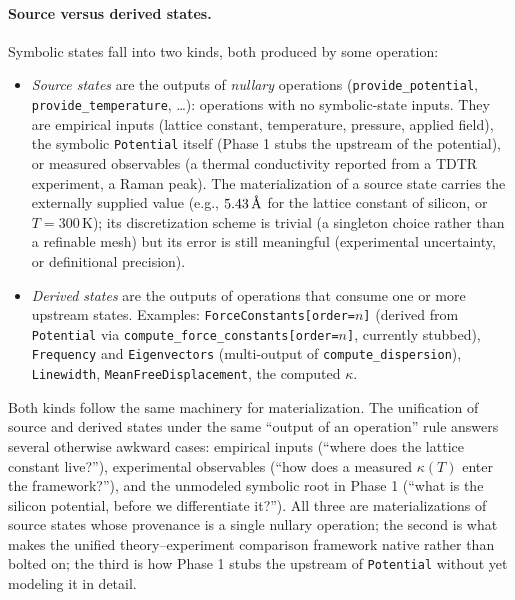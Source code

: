 \documentclass[11pt,a4paper]{article}
\begin{document}
\paragraph{Source versus derived states.} Symbolic states fall into two kinds, both
produced by some operation:
\begin{itemize}[leftmargin=2em]
  \item \emph{Source states} are the outputs of \emph{nullary} operations
        (\texttt{provide\_potential}, \texttt{provide\_temperature}, \ldots): operations
        with no symbolic-state inputs. They are empirical inputs (lattice constant,
        temperature, pressure, applied field), the symbolic \texttt{Potential} itself
        (Phase 1 stubs the upstream of the potential), or measured observables (a
        thermal conductivity reported from a TDTR experiment, a Raman peak). The
        materialization of a source state carries the externally supplied value (e.g.,
        $5.43\,\textup{\AA}$ for the lattice constant of silicon, or $T = 300\,\text{K}$);
        its discretization scheme is trivial (a singleton choice rather than a refinable
        mesh) but its error is still meaningful (experimental uncertainty, or
        definitional precision).
  \item \emph{Derived states} are the outputs of operations that consume one or more
        upstream states. Examples: \texttt{ForceConstants[order=$n$]} (derived from
        \texttt{Potential} via \texttt{compute\_force\_constants[order=$n$]}, currently
        stubbed), \texttt{Frequency} and \texttt{Eigenvectors} (multi-output of
        \texttt{compute\_dispersion}), \texttt{Linewidth},
        \texttt{MeanFreeDisplacement}, the computed $\kappa$.
\end{itemize}
Both kinds follow the same machinery for materialization. The unification of source and
derived states under the same ``output of an operation'' rule answers several otherwise
awkward cases: empirical inputs (``where does the lattice constant live?''), experimental
observables (``how does a measured $\kappa(T)$ enter the framework?''), and the unmodeled
symbolic root in Phase 1 (``what is the silicon potential, before we differentiate
it?''). All three are materializations of source states whose provenance is a single
nullary operation; the second is what makes the unified theory--experiment comparison
framework native rather than bolted on; the third is how Phase 1 stubs the upstream of
\texttt{Potential} without yet modeling it in detail.
\end{document}
